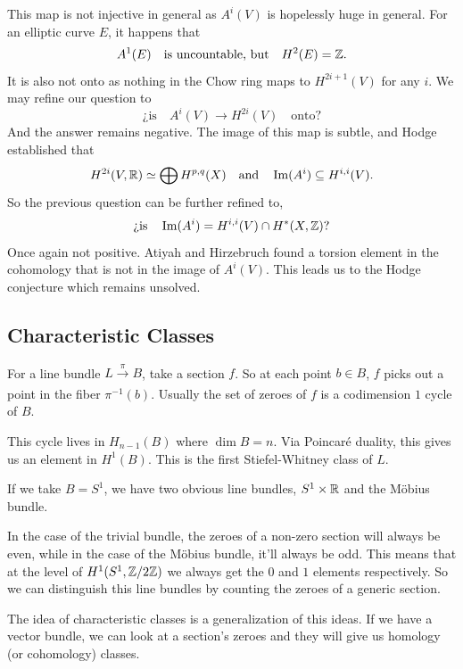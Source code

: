 \documentclass[12pt]{memoir}
\begin{document}
    This map is not injective in general as $A^i(V)$ is hopelessly huge in general. For an elliptic curve $E$, it happens that 
    $$A^{1}(E)\quad\text{is uncountable, but}\quad H^{2}(E)=\mathbb{Z}.$$
    It is also not onto as nothing in the Chow ring maps to $H^{2i+1}(V)$ for any $i$. We may refine our question to 
    $$\text{¿is}\quad A^i(V)\to H^{2i}(V)\quad\text{onto?}$$ 
    And the answer remains negative. The image of this map is subtle, and Hodge established that
    $$H^{2i}(V,\mathbb{R})\simeq\bigoplus H^{p,q}(X)\quad\text{and}\quad\Im(A^i)\subseteq H^{i,i}(V).$$
    So the previous question can be further refined to, 
    $$\text{¿is}\quad \Im(A^i)=H^{i,i}(V)\cap H^\ast(X,\mathbb{Z})?$$
    Once again not positive. Atiyah and Hirzebruch found a torsion element in the cohomology that is not in the image of $A^i(V)$. This leads us to the Hodge conjecture which remains unsolved. 

\subsection{Characteristic Classes}

\begin{Ex}
    For a line bundle $L\xrightarrow[]{\pi}B$, take a section $f$. So at each point $b\in B$, $f$ picks out a point in the fiber $\pi^{-1}(b)$. Usually the set of zeroes of $f$ is a codimension $1$ cycle of $B$.
    \begin{center}
    \end{center}
    This cycle lives in $H_{n-1}(B)$ where $\dim B=n$. Via Poincaré duality, this gives us an element in $H^1(B)$. This is the first Stiefel-Whitney class of $L$.\par
    If we take $B=S^1$, we have two obvious line bundles, $S^1\times\mathbb{R}$ and the Möbius bundle. 
    \begin{center}
    \end{center}
    In the case of the trivial bundle, the zeroes of a non-zero section will always be even, while in the case of the Möbius bundle, it'll always be odd. This means that at the level of $H^{1}(S^1,\mathbb{Z}/2\mathbb{Z})$ we always get the $0$ and $1$ elements respectively. So we can distinguish this line bundles by counting the zeroes of a generic section.
\end{Ex}

The idea of characteristic classes is a generalization of this ideas. If we have a vector bundle, we can look at a section's zeroes and they will give us homology (or cohomology) classes.
\end{document}
